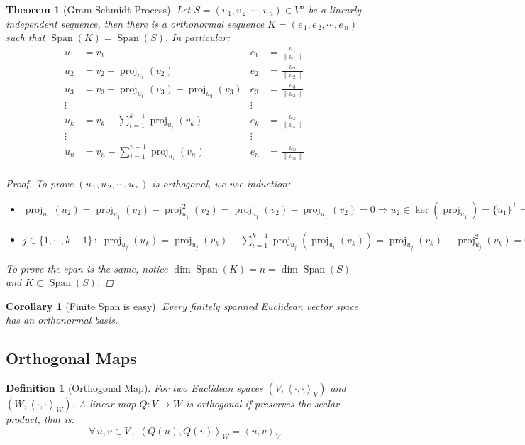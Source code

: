 \documentclass[12pt]{article}
\let\RA\Rightarrow
\newcommand{\Forall}[1]{\forall\,{#1}\,,\;}
\newcommand{\seq}[2]{\left({#1}_{\,1},{#1}_{\,2},\cdots,{#1}_{\,#2}\right)}
\newcommand{\inner}[2]{\left\langle{#1},{#2}\right\rangle}
\DeclareMathOperator{\Span}{Span}
\DeclareMathOperator{\proj}{proj}
\newtheorem{theorem}{Theorem}[subsection]
\newtheorem{definition}{Definition}[subsection]
\newtheorem{corollary}{Corollary}[subsection]
\begin{document}
\begin{theorem}[Gram-Schmidt Process]
  Let $S=\seq{v}{n}\in V^n$ be a linearly independent sequence, then there is a orthonormal sequence $K=\seq{e}{n}$ such that $\Span(K)=\Span(S)$. In particular:
  \begin{align*}
    u_1&=v_1&e_1&=\frac{u_1}{\|u_1\|}\\
    u_2&=v_2-\proj_{u_1}(v_2)&e_2&=\frac{u_2}{\|u_2\|}\\
    u_3&=v_3-\proj_{u_1}(v_3)-\proj_{u_2}(v_3)&e_3&=\frac{u_3}{\|u_3\|}\\
    \vdots&&\vdots&\\
    u_k&=v_k-\sum_{i=1}^{k-1}\proj_{u_i}(v_k)&e_k&=\frac{u_k}{\|u_k\|}\\
    \vdots&&\vdots&\\
    u_n&=v_n-\sum_{i=1}^{n-1}\proj_{u_i}(v_n)&e_n&=\frac{u_n}{\|u_n\|}\\
  \end{align*}
  \begin{proof}
    To prove $\seq{u}{n}$ is orthogonal, we use induction:
    \begin{itemize}
      \item[Base] $\proj_{u_1}(u_2)=\proj_{u_1}(v_2)-\proj_{u_1}^2(v_2)=\proj_{u_1}(v_2)-\proj_{u_1}(v_2)=0\RA u_2\in \ker(\proj_{u_1})=\{u_1\}^\perp\RA u_2\perp u_1$
      \item[Step] $j\in\{1,\cdots,k-1\}\,:\;\displaystyle\proj_{u_j}(u_k)=\proj_{u_j}(v_k)-\sum_{i=1}^{k-1}\proj_{u_j}\left(\proj_{u_i}(v_k)\right) =\proj_{u_j}(v_k)-\proj_{u_j}^2(v_k)=0\RA u_k\in \ker(\proj_{u_j})=\{u_j\}^\perp\RA u_k\perp u_j$
    \end{itemize}
    To prove the span is the same, notice $\dim\Span(K)=n=\dim\Span(S)$ and $K\subset\Span(S)$.
  \end{proof}
\end{theorem}

\begin{corollary}[Finite Span is easy]
  Every finitely spanned Euclidean vector space has an orthonormal basis.
\end{corollary}

\subsection{Orthogonal Maps}

\begin{definition}[Orthogonal Map]
  For two Euclidean spaces $(V,\inner{\cdot}{\cdot}_V)$ and $(W,\inner{\cdot}{\cdot}_W)$. A linear map $Q:V\to W$ is orthogonal if preserves the scalar product, that is:
  $$\Forall{u,v\in V}\inner{Q(u)}{Q(v)}_W=\inner{u}{v}_V$$
\end{definition}
\end{document}
